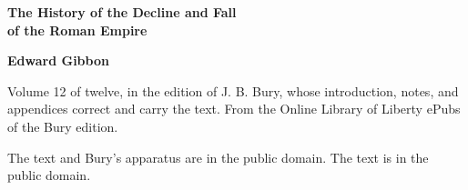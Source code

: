 \documentclass[11pt,letterpaper]{article}
\begin{document}
\color{ink}

\begin{titlepage}
\centering
\vspace*{4em}
{\LARGE\bfseries\color{heading} The History of the Decline and Fall\\[0.3em]of the Roman Empire\par}
\vspace{2em}
{\Large\bfseries\color{heading} Edward Gibbon\par}
\vspace{2.5em}
{\itshape\color{subhead}\parbox{0.8\linewidth}{\centering Volume 12 of twelve, in the edition of J. B. Bury, whose introduction, notes, and appendices correct and carry the text. From the Online Library of Liberty ePubs of the Bury edition.\par}}
\vfill
{\small The text and Bury's apparatus are in the public domain. The text is in the public domain.\par}
\vspace{2em}
\end{titlepage}

\tableofcontents


\end{document}
